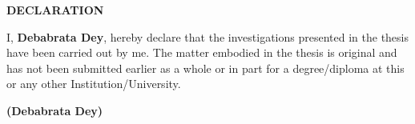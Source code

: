 \newpage
\begin{center}
\large \bf
DECLARATION
\end{center}
I, {\bf Debabrata Dey}, hereby declare that the investigations
presented in the thesis have been carried out by me. The matter
embodied in the thesis is original and has not been submitted earlier
as a whole or in part for a degree/diploma at this or any other
Institution/University.
\vspace{1.2cm}
\begin{flushright}
	\textbf{(Debabrata Dey)}
\end{flushright}
\newpage
